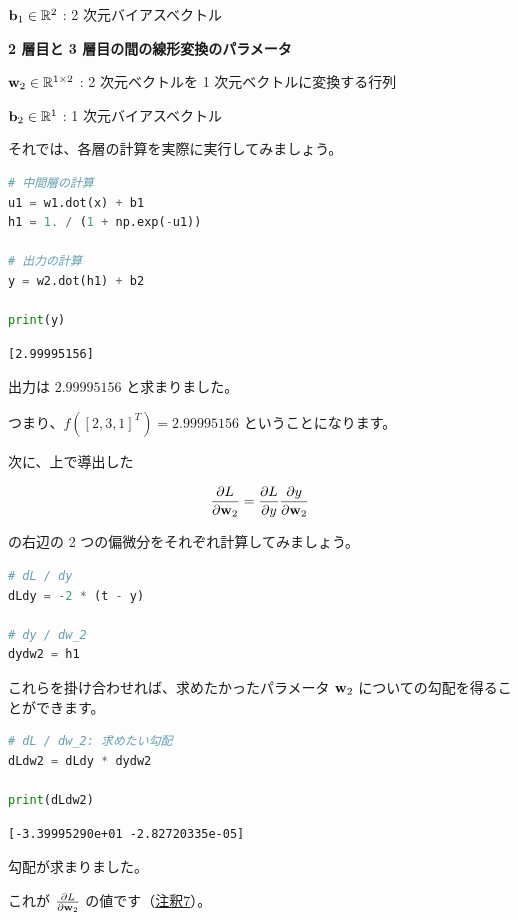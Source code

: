 ${\bf b}_1 \in \mathbb{R}^2$ : 2 次元バイアスベクトル


\textbf{2 層目と 3 層目の間の線形変換のパラメータ}


${\bf w}_2 \in \mathbb{R}^{1 \times 2}$ : 2 次元ベクトルを 1 次元ベクトルに変換する行列


${\bf b}_2 \in \mathbb{R}^1$ : 1 次元バイアスベクトル


それでは、各層の計算を実際に実行してみましょう。


\begin{lstlisting}[style=codecell,language=Python]
# 中間層の計算
u1 = w1.dot(x) + b1
h1 = 1. / (1 + np.exp(-u1))

# 出力の計算
y = w2.dot(h1) + b2

print(y)
\end{lstlisting}

\begin{lstlisting}[style=outputcell]
[2.99995156]
\end{lstlisting}

出力は $2.99995156$ と求まりました。

つまり、$f([2, 3, 1]^T) = 2.99995156$ ということになります。

次に、上で導出した


\[
\frac{\partial L}{\partial {\bf w}_2}
= \frac{\partial L}{\partial y} \frac{\partial y}{\partial {\bf w}_2}
\]


の右辺の 2 つの偏微分をそれぞれ計算してみましょう。


\begin{lstlisting}[style=codecell,language=Python]
# dL / dy
dLdy = -2 * (t - y)

# dy / dw_2
dydw2 = h1
\end{lstlisting}

これらを掛け合わせれば、求めたかったパラメータ ${\bf w}_2$ についての勾配を得ることができます。


\begin{lstlisting}[style=codecell,language=Python]
# dL / dw_2: 求めたい勾配
dLdw2 = dLdy * dydw2

print(dLdw2)
\end{lstlisting}

\begin{lstlisting}[style=outputcell]
[-3.39995290e+01 -2.82720335e-05]
\end{lstlisting}

勾配が求まりました。

これが $\frac{\partial L}{\partial {\bf w}_2}$ の値です（\hyperref[23-basics-of-neural-networks-note7]{注釈7}）。

